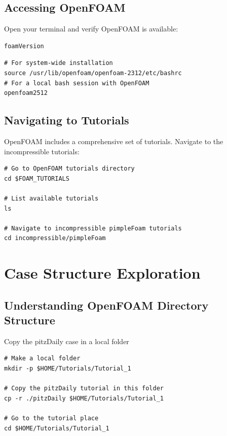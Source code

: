 \documentclass[
    parskip=half,      %
    DIV=12,            %
    headings=normal,   %
    fontsize=11pt,     %
    english            %
]{scrartcl}
\begin{document}
\subsection{Accessing OpenFOAM}
Open your terminal and verify OpenFOAM is available:

\begin{lstlisting}[style=terminal]
foamVersion
\end{lstlisting}

\begin{lstlisting}[style=terminal]
# For system-wide installation
source /usr/lib/openfoam/openfoam-2312/etc/bashrc
# For a local bash session with OpenFOAM
openfoam2512
\end{lstlisting}

\subsection{Navigating to Tutorials}
OpenFOAM includes a comprehensive set of tutorials. Navigate to the incompressible tutorials:

\begin{lstlisting}[style=terminal]
# Go to OpenFOAM tutorials directory
cd $FOAM_TUTORIALS

# List available tutorials
ls

# Navigate to incompressible pimpleFoam tutorials
cd incompressible/pimpleFoam
\end{lstlisting}

\section{Case Structure Exploration}

\subsection{Understanding OpenFOAM Directory Structure}

Copy the pitzDaily case in a local folder

\begin{lstlisting}[style=terminal]
# Make a local folder
mkdir -p $HOME/Tutorials/Tutorial_1

# Copy the pitzDaily tutorial in this folder
cp -r ./pitzDaily $HOME/Tutorials/Tutorial_1

# Go to the tutorial place
cd $HOME/Tutorials/Tutorial_1
\end{lstlisting}
\end{document}
